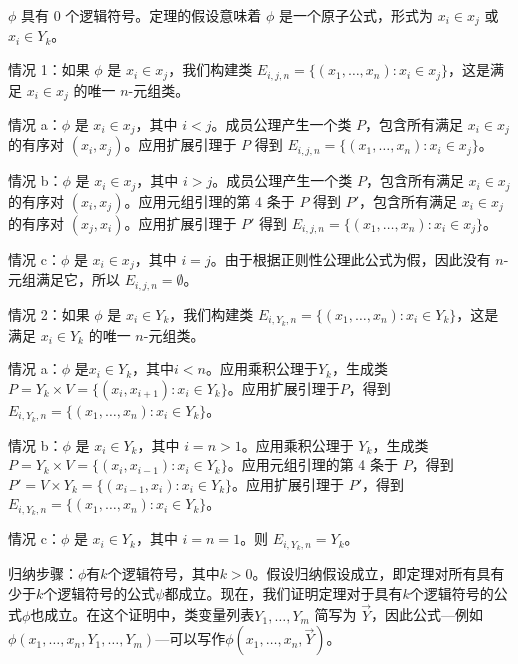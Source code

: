 \(\phi\) 具有 0 个逻辑符号。定理的假设意味着 \(\phi\) 是一个原子公式，形式为 \(x_i \in x_j\) 或 \(x_i \in Y_k\)。

情况 1：如果 \(\phi\) 是 \(x_i \in x_j\)，我们构建类 \(E_{i,j,n} = \{(x_1, \dots, x_n) : x_i \in x_j\}\)，这是满足 \(x_i \in x_j\) 的唯一 \(n\)-元组类。

情况 a：\(\phi\) 是 \(x_i \in x_j\)，其中 \(i < j\)。成员公理产生一个类 \(P\)，包含所有满足 \(x_i \in x_j\) 的有序对 \((x_i, x_j)\)。应用扩展引理于 \(P\) 得到 \(E_{i,j,n} = \{(x_1, \dots, x_n) : x_i \in x_j\}\)。

情况 b：\(\phi\) 是 \(x_i \in x_j\)，其中 \(i > j\)。成员公理产生一个类 \(P\)，包含所有满足 \(x_i \in x_j\) 的有序对 \((x_i, x_j)\)。应用元组引理的第 4 条于 \(P\) 得到 \(P'\)，包含所有满足 \(x_i \in x_j\) 的有序对 \((x_j, x_i)\)。应用扩展引理于 \(P'\) 得到 \(E_{i,j,n} = \{(x_1, \dots, x_n) : x_i \in x_j\}\)。

情况 c：\(\phi\) 是 \(x_i \in x_j\)，其中 \(i = j\)。由于根据正则性公理此公式为假，因此没有 \(n\)-元组满足它，所以 \(E_{i,j,n} = \emptyset\)。

情况 2：如果 \(\phi\) 是 \(x_i \in Y_k\)，我们构建类 \(E_{i,Y_k,n} = \{(x_1, \dots, x_n) : x_i \in Y_k\}\)，这是满足 \(x_i \in Y_k\) 的唯一 \(n\)-元组类。

情况 a：\(\phi\) 是\(x_i \in Y_k\)，其中\(i < n\)。应用乘积公理于\(Y_k\)，生成类\(P = Y_k \times V = \{(x_i, x_{i+1}) : x_i \in Y_k\}\)。应用扩展引理于\(P\)，得到\(E_{i,Y_k,n} = \{(x_1, \dots, x_n) : x_i \in Y_k\}\)。

情况 b：\(\phi\) 是 \(x_i \in Y_k\)，其中 \(i = n > 1\)。应用乘积公理于 \(Y_k\)，生成类 \(P = Y_k \times V = \{(x_i, x_{i-1}) : x_i \in Y_k\}\)。应用元组引理的第 4 条于 \(P\)，得到 \(P' = V \times Y_k = \{(x_{i-1}, x_i) : x_i \in Y_k\}\)。应用扩展引理于 \(P'\)，得到 \(E_{i,Y_k,n} = \{(x_1, \dots, x_n) : x_i \in Y_k\}\)。

情况 c：\(\phi\) 是 \(x_i \in Y_k\)，其中 \(i = n = 1\)。则 \(E_{i,Y_k,n} = Y_k\)。

归纳步骤：\(\phi\)有\(k\)个逻辑符号，其中\(k > 0\)。假设归纳假设成立，即定理对所有具有少于\(k\)个逻辑符号的公式\(\psi\)都成立。现在，我们证明定理对于具有\(k\)个逻辑符号的公式\(\phi\)也成立。在这个证明中，类变量列表\(Y_1, \dots, Y_m\) 简写为 \(\vec{Y}\)，因此公式—例如\(\phi(x_1, \dots, x_n, Y_1, \dots, Y_m)\)—可以写作\(\phi(x_1, \dots, x_n,\vec{Y})\)。

